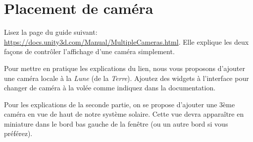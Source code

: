 \documentclass[a4paper,10pt]{article}
\begin{document}
\section{Placement de caméra}

Lisez la page du guide suivant: \url{https://docs.unity3d.com/Manual/MultipleCameras.html}. Elle explique les deux façons de contrôler l'affichage d'une caméra simplement.

Pour mettre en pratique les explications du lien, nous vous proposons d'ajouter une caméra locale à la \textit{Lune} (de la \textit{Terre}). Ajoutez des widgets à l'interface pour changer de caméra à la volée comme indiquez dans la documentation.

Pour les explications de la seconde partie, on se propose d'ajouter une 3ème caméra en vue de haut de notre système solaire. Cette vue devra apparaître en miniature dans le bord bas gauche de la fenêtre (ou un autre bord si vous préférez).
\end{document}
